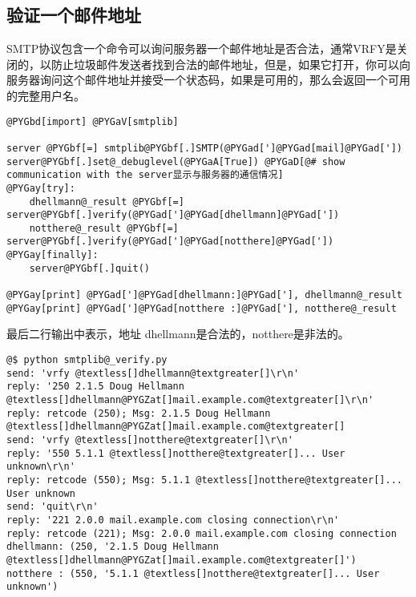 \documentclass[letterpaper,10pt,english]{manual}
\begin{document}
\subsection{验证一个邮件地址}

SMTP协议包含一个命令可以询问服务器一个邮件地址是否合法，通常VRFY是关闭的，以防止垃圾邮件发送者找到合法的邮件地址，但是，如果它打开，你可以向服务器询问这个邮件地址并接受一个状态码，如果是可用的，那么会返回一个可用的完整用户名。

\begin{Verbatim}[commandchars=@\[\]]
@PYGbd[import] @PYGaV[smtplib]

server @PYGbf[=] smtplib@PYGbf[.]SMTP(@PYGad[']@PYGad[mail]@PYGad['])
server@PYGbf[.]set@_debuglevel(@PYGaA[True]) @PYGaD[@# show communication with the server显示与服务器的通信情况]
@PYGay[try]:
    dhellmann@_result @PYGbf[=] server@PYGbf[.]verify(@PYGad[']@PYGad[dhellmann]@PYGad['])
    notthere@_result @PYGbf[=] server@PYGbf[.]verify(@PYGad[']@PYGad[notthere]@PYGad['])
@PYGay[finally]:
    server@PYGbf[.]quit()

@PYGay[print] @PYGad[']@PYGad[dhellmann:]@PYGad['], dhellmann@_result
@PYGay[print] @PYGad[']@PYGad[notthere :]@PYGad['], notthere@_result
\end{Verbatim}

最后二行输出中表示，地址 dhellmann是合法的，notthere是非法的。

\begin{Verbatim}[commandchars=@\[\]]
@$ python smtplib@_verify.py
send: 'vrfy @textless[]dhellmann@textgreater[]\r\n'
reply: '250 2.1.5 Doug Hellmann @textless[]dhellmann@PYGZat[]mail.example.com@textgreater[]\r\n'
reply: retcode (250); Msg: 2.1.5 Doug Hellmann @textless[]dhellmann@PYGZat[]mail.example.com@textgreater[]
send: 'vrfy @textless[]notthere@textgreater[]\r\n'
reply: '550 5.1.1 @textless[]notthere@textgreater[]... User unknown\r\n'
reply: retcode (550); Msg: 5.1.1 @textless[]notthere@textgreater[]... User unknown
send: 'quit\r\n'
reply: '221 2.0.0 mail.example.com closing connection\r\n'
reply: retcode (221); Msg: 2.0.0 mail.example.com closing connection
dhellmann: (250, '2.1.5 Doug Hellmann @textless[]dhellmann@PYGZat[]mail.example.com@textgreater[]')
notthere : (550, '5.1.1 @textless[]notthere@textgreater[]... User unknown')
\end{Verbatim}
\end{document}
